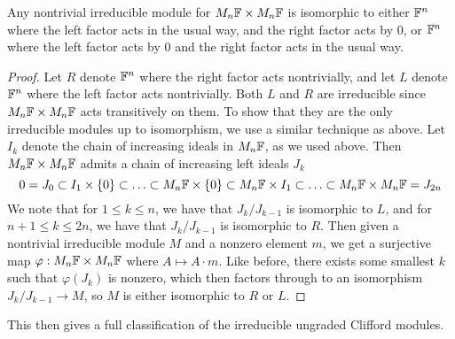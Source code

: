 %
\begin{thm}
Any nontrivial irreducible module for $M_n\mathbb{F} \times M_n\mathbb{F}$ is isomorphic to
either $\mathbb{F}^n$ where the left factor acts in the usual way, and the right factor
acts by $0$, or $\mathbb{F}^n$ where the left factor acts by $0$ and the right factor
acts in the usual way.
\end{thm}
%
\begin{proof}
Let $R$ denote $\mathbb{F}^n$ where the right factor acts nontrivially, and let $L$
denote $\mathbb{F}^n$ where the left factor acts nontrivially. Both $L$ and $R$ are
irreducible since $M_n\mathbb{F} \times M_n\mathbb{F}$ acts transitively on them. To show
that they are the only irreducible modules up to isomorphism, we use a similar
technique as above. Let $I_k$ denote the chain of increasing ideals in $M_n\mathbb{F}$,
as we used above. Then $M_n\mathbb{F} \times M_n\mathbb{F}$ admits a chain of increasing left
ideals $J_k$
\[
0 = J_0 \subset I_1 \times \left\lbrace 0 \right\rbrace \subset \ldots \subset M_n\mathbb{F} \times \left\lbrace 0 \right\rbrace
\subset M_n\mathbb{F} \times I_1 \subset \ldots \subset M_n\mathbb{F} \times M_n\mathbb{F} = J_{2n}
\]
We note that for $1 \leq k \leq n$, we have that $J_k / J_{k-1}$ is isomorphic to
$L$, and for $n+1 \leq k \leq 2n$, we have that $J_k / J_{k-1}$ is isomorphic to
$R$. Then given a nontrivial irreducible module $M$ and a nonzero element $m$,
we get a surjective map $\varphi : M_n\mathbb{F} \times M_n\mathbb{F}$ where $A \mapsto A\cdot m$.
Like before, there exists some smallest $k$ such that $\varphi(J_k)$ is nonzero,
which then factors through to an isomorphism $J_k / J_{k-1} \to M$, so $M$
is either isomorphic to $R$ or $L$.
\end{proof}
%
This then gives a full classification of the irreducible ungraded Clifford
modules.\\

